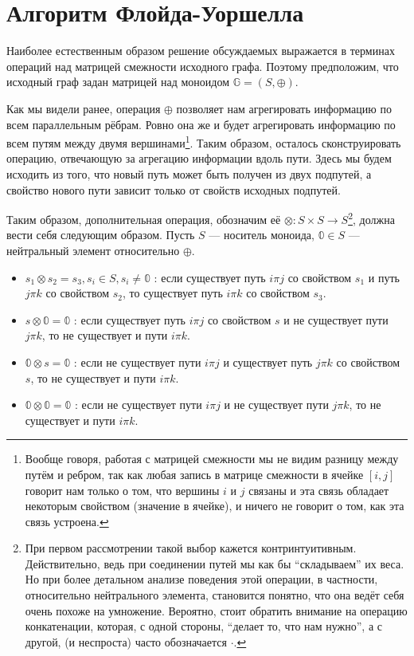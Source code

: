 \section{Алгоритм Флойда-Уоршелла}

Наиболее естественным образом решение обсуждаемых выражается в терминах операций над матрицей смежности исходного графа. Поэтому предположим, что исходный граф задан матрицей над моноидом $\mathbb{G} = (S,\oplus)$.

Как мы видели ранее, операция $\oplus$ позволяет нам агрегировать информацию по всем параллельным рёбрам. Ровно она же и будет агрегировать информацию по всем путям между двумя вершинами\footnote{Вообще говоря, работая с матрицей смежности мы не видим разницу между путём и ребром, так как любая запись в матрице смежности в ячейке $[i,j]$ говорит нам только о том, что вершины $i$ и $j$ связаны и эта связь обладает некоторым свойством (значение в ячейке), и ничего не говорит о том, как эта связь устроена.}. Таким образом, осталось сконструировать операцию, отвечающую за агрегацию информации вдоль пути. Здесь мы будем исходить из того, что новый путь может быть получен из двух подпутей, а свойство нового пути зависит только от свойств исходных подпутей.

Таким образом, дополнительная операция, обозначим её $\otimes: S \times S \to S$\footnote{При первом рассмотрении такой выбор кажется контринтуитивным. Действительно, ведь при соединении путей мы как бы ``складываем'' их веса. Но при более детальном анализе поведения этой операции, в частности, относительно нейтрального элемента, становится понятно, что она ведёт себя очень похоже на умножение. Вероятно, стоит обратить внимание на операцию конкатенации, которая, с одной стороны, ``делает то, что нам нужно'', а с другой, (и неспроста) часто обозначается $\cdot$.}, должна вести себя следующим образом. Пусть $S$ --- носитель моноида, $\mathbb{0} \in S$ --- нейтральный элемент относительно $\oplus$.
\begin{itemize}\label{itm:otimesIntro}
  \item $s_1 \otimes s_2 = s_3, s_i \in S, s_i \neq \mathbb{0}$ : если существует путь $i \pi j$ со свойством $s_1$ и путь $j \pi k$ со свойством $s_2$, то существует путь $i \pi k$ со свойством $s_3$.
  \item $s \otimes \mathbb{0} = \mathbb{0}$ : если существует путь $i \pi j$ со свойством $s$ и не существует пути $j \pi k$, то не существует и пути $i \pi k$.
  \item $\mathbb{0} \otimes s = \mathbb{0}$ : если не существует пути $i \pi j$ и существует путь $j \pi k$ со свойством $s$, то не существует и пути $i \pi k$.
  \item $\mathbb{0} \otimes \mathbb{0} = \mathbb{0}$ : если не существует пути $i \pi j$ и не существует пути $j \pi k$, то не существует и пути $i \pi k$.
\end{itemize}

